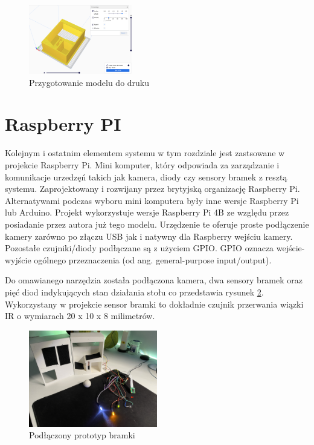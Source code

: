 \begin{figure}[h!]
  \centering
    \includegraphics[width=0.4\textwidth]{images/3D/cura_gate.png}
  \caption{Przygotowanie modelu do druku}
  \label{fig:cura-file-preparation}
\end{figure}

\label{ch:hardware:raspberrypi}
\section{Raspberry PI}
Kolejnym i ostatnim elementem systemu w tym rozdziale jest zastsowane w projekcie Raspberry Pi. Mini komputer, który odpowiada za zarządzanie i komunikacje urzedzęń takich jak kamera, diody czy sensory bramek z resztą systemu. Zaprojektowany i rozwijany przez brytyjską organizację Raspberry Pi. Alternatywami podczas wyboru mini komputera były inne wersje Raspberry Pi lub Arduino. Projekt wykorzystuje wersje Raspberry Pi 4B ze względu przez posiadanie przez autora już tego modelu. Urzędzenie te oferuje proste podłączenie kamery zarówno po złączu USB jak i natywny dla Raspberry wejściu kamery. Pozostałe czujniki/diody podłączane są z użyciem GPIO. GPIO oznacza wejście-wyjście ogólnego przeznaczenia (od ang. general-purpose input/output).

Do omawianego narzędzia została podłączona kamera, dwa sensory bramek oraz pięć diod indykujących stan działania stołu co przedstawia rysunek \ref{fig:connected-gate}. Wykorzystany w projekcie sensor bramki to dokładnie czujnik przerwania wiązki IR o wymiarach 20 x 10 x 8 milimetrów.

\begin{figure}[h!]
  \centering
    \includegraphics[width=0.5\textwidth]{images/hardware/prototyp-bramki.jpg}
  \caption{Podłączony prototyp bramki}
  \label{fig:connected-gate}
\end{figure}